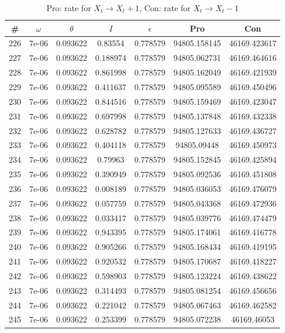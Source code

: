 \newpage
\begin{table}
\caption{Pro: rate for $X_t \rightarrow X_t + 1$, Con: rate for $X_t \rightarrow X_t - 1$}
\begin{tabular*}{\linewidth}{c|c|c|c|c|c|c}
\# & $\omega$ & $\theta$ & $I$ & $\epsilon$ & Pro & Con \\
\hline
226 & 7e-06 & 0.093622 & 0.83554 & 0.778579 & 94805.158145 & 46169.423617\\
227 & 7e-06 & 0.093622 & 0.188974 & 0.778579 & 94805.062731 & 46169.464616\\
228 & 7e-06 & 0.093622 & 0.861998 & 0.778579 & 94805.162049 & 46169.421939\\
229 & 7e-06 & 0.093622 & 0.411637 & 0.778579 & 94805.095589 & 46169.450496\\
230 & 7e-06 & 0.093622 & 0.844516 & 0.778579 & 94805.159469 & 46169.423047\\
231 & 7e-06 & 0.093622 & 0.697998 & 0.778579 & 94805.137848 & 46169.432338\\
232 & 7e-06 & 0.093622 & 0.628782 & 0.778579 & 94805.127633 & 46169.436727\\
233 & 7e-06 & 0.093622 & 0.404118 & 0.778579 & 94805.09448 & 46169.450973\\
234 & 7e-06 & 0.093622 & 0.79963 & 0.778579 & 94805.152845 & 46169.425894\\
235 & 7e-06 & 0.093622 & 0.390949 & 0.778579 & 94805.092536 & 46169.451808\\
236 & 7e-06 & 0.093622 & 0.008189 & 0.778579 & 94805.036053 & 46169.476079\\
237 & 7e-06 & 0.093622 & 0.057759 & 0.778579 & 94805.043368 & 46169.472936\\
238 & 7e-06 & 0.093622 & 0.033417 & 0.778579 & 94805.039776 & 46169.474479\\
239 & 7e-06 & 0.093622 & 0.943395 & 0.778579 & 94805.174061 & 46169.416778\\
240 & 7e-06 & 0.093622 & 0.905266 & 0.778579 & 94805.168434 & 46169.419195\\
241 & 7e-06 & 0.093622 & 0.920532 & 0.778579 & 94805.170687 & 46169.418227\\
242 & 7e-06 & 0.093622 & 0.598903 & 0.778579 & 94805.123224 & 46169.438622\\
243 & 7e-06 & 0.093622 & 0.314493 & 0.778579 & 94805.081254 & 46169.456656\\
244 & 7e-06 & 0.093622 & 0.221042 & 0.778579 & 94805.067463 & 46169.462582\\
245 & 7e-06 & 0.093622 & 0.253399 & 0.778579 & 94805.072238 & 46169.46053\\

\end{tabular*}
\end{table}
